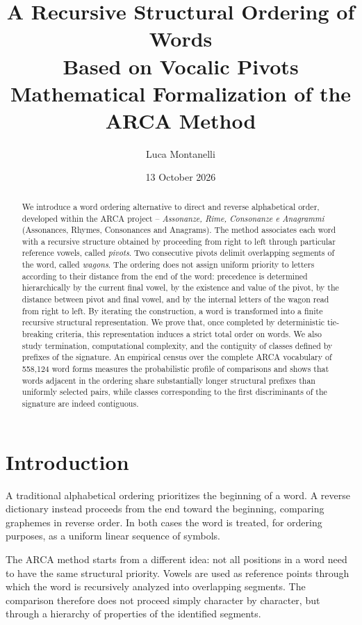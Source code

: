 \documentclass[11pt,a4paper]{article}
\title{\textbf{A Recursive Structural Ordering of Words\\Based on Vocalic Pivots}\\[0.5em]
\large Mathematical Formalization of the ARCA Method}
\author{Luca Montanelli}
\date{13 October 2026}
\theoremstyle{definition}
\theoremstyle{remark}
\begin{document}
\maketitle

\begin{abstract}
We introduce a word ordering alternative to direct and reverse alphabetical order, developed within the ARCA project -- \emph{Assonanze, Rime, Consonanze e Anagrammi} (Assonances, Rhymes, Consonances and Anagrams). The method associates each word with a recursive structure obtained by proceeding from right to left through particular reference vowels, called \emph{pivots}. Two consecutive pivots delimit overlapping segments of the word, called \emph{wagons}. The ordering does not assign uniform priority to letters according to their distance from the end of the word: precedence is determined hierarchically by the current final vowel, by the existence and value of the pivot, by the distance between pivot and final vowel, and by the internal letters of the wagon read from right to left. By iterating the construction, a word is transformed into a finite recursive structural representation. We prove that, once completed by deterministic tie-breaking criteria, this representation induces a strict total order on words. We also study termination, computational complexity, and the contiguity of classes defined by prefixes of the signature. An empirical census over the complete ARCA vocabulary of 558,124 word forms measures the probabilistic profile of comparisons and shows that words adjacent in the ordering share substantially longer structural prefixes than uniformly selected pairs, while classes corresponding to the first discriminants of the signature are indeed contiguous.
\end{abstract}

\section{Introduction}

A traditional alphabetical ordering prioritizes the beginning of a word. A reverse dictionary instead proceeds from the end toward the beginning, comparing graphemes in reverse order. In both cases the word is treated, for ordering purposes, as a uniform linear sequence of symbols.

The ARCA method starts from a different idea: not all positions in a word need to have the same structural priority. Vowels are used as reference points through which the word is recursively analyzed into overlapping segments. The comparison therefore does not proceed simply character by character, but through a hierarchy of properties of the identified segments.
\end{document}

